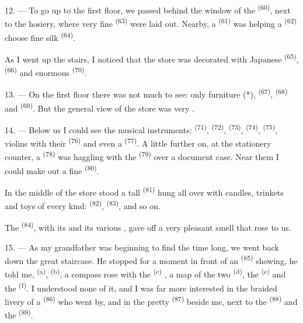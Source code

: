 12. --- To go up to the first floor, we passed behind the window of the
 \textsuperscript{(60)}, next to the hosiery, where very fine
 \textsuperscript{(63)} were laid out. Nearby, a 
\textsuperscript{(61)} was helping a  \textsuperscript{(62)} choose fine silk
 \textsuperscript{(64)}.

As I went up the stairs, I noticed that the store was decorated with
Japanese  \textsuperscript{(65)},  \textsuperscript{(66)} and
enormous  \textsuperscript{(70)}.

13. --- On the first floor there was not much to see: only furniture (*),
 \textsuperscript{(67)},  \textsuperscript{(68)} and
 \textsuperscript{(69)}. But the general view of the store was very
.

14. --- Below us I could see the musical instruments: 
\textsuperscript{(71)},  \textsuperscript{(72)},  \textsuperscript{(73)},
 \textsuperscript{(74)},  \textsuperscript{(75)}, violins with
their  \textsuperscript{(76)} and even a  \textsuperscript{(77)}. A
little further on, at the stationery counter, a 
\textsuperscript{(78)} was haggling with the  \textsuperscript{(79)} over a
document case. Near them I could make out a fine 
\textsuperscript{(80)}.

In the middle of the store stood a tall 
\textsuperscript{(81)} hung all over with candles, trinkets and toys of every kind:
 \textsuperscript{(82)},  \textsuperscript{(83)}, and so on.

The  \textsuperscript{(84)}, with its  and its
various , gave off a very pleasant smell that rose to us.

\VUsaut{3.4mm}
\VUsaut{2.8mm}

15. --- As my grandfather was beginning to find the time long, we went back
down the great staircase. He stopped for a moment in front of an
 \textsuperscript{(85)} showing, he told me, 
\textsuperscript{(a)},  \textsuperscript{(b)}, a compass
rose with the  \textsuperscript{(c)}
, a map of the two
 \textsuperscript{(d)}, the  \textsuperscript{(e)} and the
 \textsuperscript{(f)}. I understood none of it, and I was far
more interested in the braided livery of a 
\textsuperscript{(86)} who went by, and in the pretty  \textsuperscript{(87)} beside
me, next to the  \textsuperscript{(88)} and the 
\textsuperscript{(89)}.

